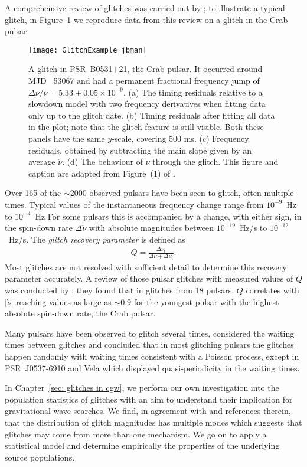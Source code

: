 A comprehensive review of glitches was carried out by
\citet{Espinoza2011}; to illustrate a typical glitch, in Figure~\ref{fig: glitch}
we reproduce data from this review on a glitch in the Crab pulsar.
\begin{figure}[htb]
    \centering
    \texttt{[image: GlitchExample\_jbman]}
    \caption{
A glitch in PSR~B0531+21, the Crab pulsar. It occurred around MJD\protect\footnotemark
~53067 and had a permanent fractional frequency jump of $\Delta\nu/\nu = 5.33 \pm 0.05
{\times}10^{-9}$. (a) The timing residuals relative to a
slowdown model with two frequency derivatives when fitting data only up to the
glitch date. (b) Timing residuals after fitting all data in the plot; note
that the glitch feature is still visible. Both these panels have the same
$y$-scale, covering 500 ms. (c) Frequency residuals, obtained by subtracting the
main slope given by an average $\dot\nu$. (d) The behaviour of $\dot\nu$
through the glitch. This figure and caption are adapted from Figure~(1) of
\citet{Espinoza2011}.}
    \label{fig: glitch}
\end{figure}

Over 165 of the $\sim$2000 observed pulsars have been seen to glitch, often multiple
times. Typical values of the instantaneous frequency change range from
$10^{-9}$~Hz to $10^{-4}$~Hz For some pulsars this is accompanied by a change,
with either sign, in the spin-down rate $\Delta\dot{\nu}$ with absolute
magnitudes between $10^{-19}$~Hz/s to $10^{-12}$~Hz/s.
The \emph{glitch recovery parameter} is defined as
\begin{align}
Q = \frac{\Delta\nu_\textrm{t}}{\Delta\nu + \Delta\nu_\textrm{t}}.
\end{align}
Most glitches are not resolved with sufficient detail to determine this
recovery parameter accurately. A review of those pulsar glitches with measured
values of $Q$ was conducted by \citet{Lyne2000}; they found that in glitches
from 18 pulsars, $Q$ correlates with $|\dot{\nu}|$ reaching values as large as
$\sim0.9$ for the youngest pulsar with the highest absolute spin-down rate, the
Crab pulsar.

Many pulsars have been observed to glitch several times, \citet{Melatos2008}
considered the waiting times between glitches and concluded that in most
glitching pulsars the glitches happen randomly with waiting times consistent
with a Poisson process, except in PSR~J0537-6910 and Vela which
displayed quasi-periodicity in the waiting times.

In Chapter~\ref{sec: glitches in cgw}, we perform our own investigation into the
population statistics of glitches with an aim to understand their implication
for gravitational wave searches. We find, in agreement with
\citet{Espinoza2011} and references therein, that the distribution of glitch
magnitudes has multiple modes which suggests that glitches may come from more
than one mechanism. We go on to apply a statistical model and determine empirically
the properties of the underlying source populations.

